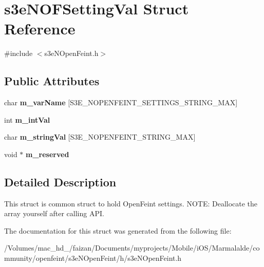 \hypertarget{structs3e_n_o_f_setting_val}{
\section{s3eNOFSettingVal Struct Reference}
\label{structs3e_n_o_f_setting_val}
}


{\ttfamily \#include $<$s3eNOpenFeint.h$>$}

\subsection*{Public Attributes}
\begin{DoxyCompactItemize}
\item 
\hypertarget{structs3e_n_o_f_setting_val_afd09031ddf2e86b8faa46b8d3574dcda}{
char {\bfseries m\_\-varName} \mbox{[}S3E\_\-NOPENFEINT\_\-SETTINGS\_\-STRING\_\-MAX\mbox{]}}
\label{structs3e_n_o_f_setting_val_afd09031ddf2e86b8faa46b8d3574dcda}

\item 
\hypertarget{group___n_open_feint_api_group_ga8a04c29667152dbeadff79152b7dbb24}{
int {\bfseries m\_\-intVal}}
\label{group___n_open_feint_api_group_ga8a04c29667152dbeadff79152b7dbb24}

\item 
\hypertarget{group___n_open_feint_api_group_ga9ba119d360def536cc5e03bc76d58cdd}{
char {\bfseries m\_\-stringVal} \mbox{[}S3E\_\-NOPENFEINT\_\-STRING\_\-MAX\mbox{]}}
\label{group___n_open_feint_api_group_ga9ba119d360def536cc5e03bc76d58cdd}

\item 
\hypertarget{group___n_open_feint_api_group_ga6aee3bd956a465ec8553735c8a34f3c2}{
void $\ast$ {\bfseries m\_\-reserved}}
\label{group___n_open_feint_api_group_ga6aee3bd956a465ec8553735c8a34f3c2}

\end{DoxyCompactItemize}


\subsection{Detailed Description}
This struct is common struct to hold OpenFeint settings. NOTE: Deallocate the array yourself after calling API. 

The documentation for this struct was generated from the following file:\begin{DoxyCompactItemize}
\item 
/Volumes/mac\_\-hd\_/faizan/Documents/myprojects/Mobile/iOS/Marmalalde/community/openfeint/s3eNOpenFeint/h/s3eNOpenFeint.h\end{DoxyCompactItemize}
